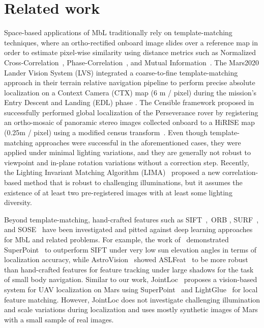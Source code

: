 \section{Related work}
\label{sec:related_work}



Space-based applications of MbL traditionally rely on template-matching techniques, where an ortho-rectified onboard image slides over a reference map in order to estimate pixel-wise similarity using distance metrics such as Normalized Cross-Correlation~\cite{pham2021rover}, Phase-Correlation~\cite{WAN2016198}, and Mutual Information~\cite{ansar2009multi}.
The Mars2020 Lander Vision System (LVS) integrated a coarse-to-fine template-matching approach in their terrain relative navigation pipeline to perform precise absolute localization on a Context Camera (CTX) map (6 m / pixel) during the mission's Entry Descent and Landing (EDL) phase \cite{johnson2023}.
The Censible framework proposed in \cite{nash2024} successfully performed global localization of the Perseverance rover by registering an ortho-mosaic of panoramic stereo images collected onboard to a HiRISE map (0.25m / pixel) using a modified census transform~\cite{zabih1994non}. Even though template-matching approaches were successful in the aforementioned cases, they were applied under minimal lighting variations, and they are generally not robust to viewpoint and in-plane rotation variations without a correction step. Recently, the Lighting Invariant Matching Algorithm (LIMA)~\cite{rothenberger2025illumination} proposed a new correlation-based method that is robust to challenging illuminations, but it assumes the existence of at least two pre-registered images with at least some lighting diversity.

Beyond template-matching, hand-crafted features such as SIFT~\cite{sift},~ORB \cite{orb}, SURF~\cite{surf}, and SOSE~\cite{cheng2024simultaneous} have been investigated and pitted against deep learning approaches for MbL and related problems. For example, the work of~\cite{brockers2022} demonstrated SuperPoint~\cite{superpoint} to outperform SIFT under very low sun elevation angles in terms of localization accuracy, while AstroVision~\cite{driver2023astrovision} showed
ASLFeat~\cite{luo2020aslfeat} to be more robust than hand-crafted features for feature tracking under large shadows for the task of small body navigation. Similar to our work, JointLoc~\cite{luo2024jointloc} proposes a vision-based system for UAV localization on Mars using SuperPoint~\cite{superpoint} and LightGlue~\cite{lindenberger2023lightglue} for local feature matching. However, JointLoc does not investigate challenging illumination and scale variations during localization and uses mostly synthetic images of Mars with a small sample of real images.

